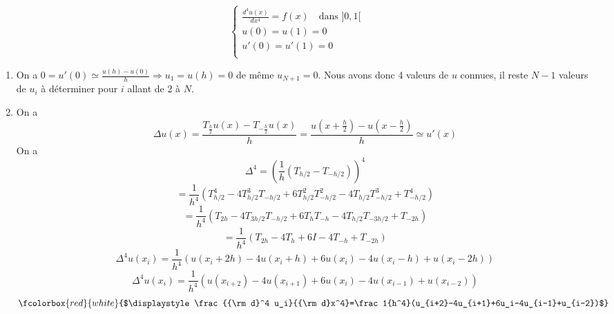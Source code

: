 \documentclass[a4paper,11pt]{article}
\def \de {{\rm d}}
\newcommand{\myredbox}[1]{\fcolorbox{red}{white}{$\displaystyle#1$}}
\begin{document}
\[\left\{\begin{array}{l}
\frac{d^4u(x)}{dx^4}=f(x)\quad\mbox{dans }]0,1[\\
u(0)=u(1)=0\\
u'(0)=u'(1)=0\\
\end{array}\right.
\]

\begin{enumerate}
\item On a $0=u'(0)\simeq \frac{u(h)-u(0)}{h}\Longrightarrow u_1=u(h)=0$ de même $u_{N+1}=0$. Nous avons donc 4 valeurs de $u$ connues, il reste $N-1$ valeurs de $u_i$ à déterminer pour $i$ allant de 2 à $N$. 

\item On a
\[\Delta u(x)= \frac{T_{\frac h2}u(x)-T_{-\frac h2}u(x)}{h}= \frac{u(x+\frac h2)-u(x-\frac h2)}{h}\simeq u'(x)\]
On a
\[\Delta^4=\left(\frac 1h(T_{h/2}-T_{-h/2})\right)^4\]\[=\frac 1{h^4}(T^4_{h/2}-4T^3_{h/2}T_{-h/2}+6T^2_{h/2}T^2_{-h/2}-4T_{h/2}T^3_{-h/2}+T^4_{-h/2})\]
\[=\frac 1{h^4}(T_{2h}-4T_{3h/2}T_{-h/2}+6T_{h}T_{-h}-4T_{h/2}T_{-3h/2}+T_{-2h})\]
\[=\frac 1{h^4}(T_{2h}-4T_{h}+6I-4T_{-h}+T_{-2h})\]
\[\Delta^4u(x_i)=\frac 1{h^4}(u(x_i+2h)-4u(x_i+h)+6u(x_i)-4u(x_i-h)+u(x_i-2h))\]
\[\Delta^4u(x_i)=\frac 1{h^4}(u(x_{i+2})-4u(x_{i+1})+6u(x_i)-4u(x_{i-1})+u(x_{i-2}))\]
\[\myredbox{\frac{\de^4 u_i}{\de x^4}=\frac 1{h^4}(u_{i+2}-4u_{i+1}+6u_i-4u_{i-1}+u_{i-2})}\]



\end{enumerate}
\end{document}
